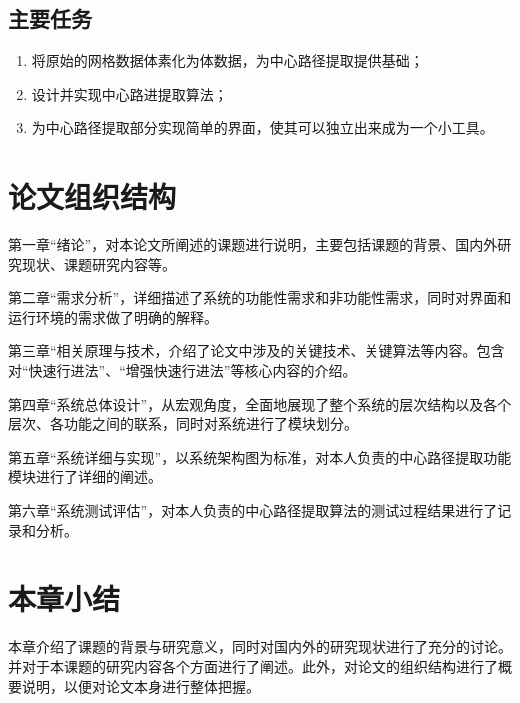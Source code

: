 \subsection{主要任务}

\begin{enumerate}
    \item 将原始的网格数据体素化为体数据，为中心路径提取提供基础；
    \item 设计并实现中心路进提取算法；
    \item 为中心路径提取部分实现简单的界面，使其可以独立出来成为一个小工具。
\end{enumerate}

\section{论文组织结构}
第一章“绪论”，对本论文所阐述的课题进行说明，主要包括课题的背景、国内外研究现状、课题研究内容等。

第二章“需求分析”，详细描述了系统的功能性需求和非功能性需求，同时对界面和运行环境的需求做了明确的解释。

第三章“相关原理与技术，介绍了论文中涉及的关键技术、关键算法等内容。包含对“快速行进法”、“增强快速行进法”等核心内容的介绍。

第四章“系统总体设计”，从宏观角度，全面地展现了整个系统的层次结构以及各个层次、各功能之间的联系，同时对系统进行了模块划分。

第五章“系统详细与实现”，以系统架构图为标准，对本人负责的中心路径提取功能模块进行了详细的阐述。

第六章“系统测试评估”，对本人负责的中心路径提取算法的测试过程结果进行了记录和分析。

\section{本章小结}
本章介绍了课题的背景与研究意义，同时对国内外的研究现状进行了充分的讨论。并对于本课题的研究内容各个方面进行了阐述。此外，对论文的组织结构进行了概要说明，以便对论文本身进行整体把握。
